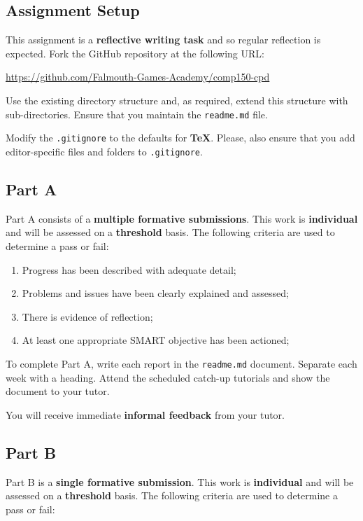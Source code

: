 \documentclass{../../fal_assignment}
\begin{document}
\subsection*{Assignment Setup}

This assignment is a \textbf{reflective writing task} and so regular reflection is expected. Fork the GitHub repository at the following URL:

\indent \url{https://github.com/Falmouth-Games-Academy/comp150-cpd}

Use the existing directory structure and, as required, extend this structure with sub-directories. Ensure that you maintain the \texttt{readme.md} file. 

Modify the \texttt{.gitignore} to the defaults for \textbf{TeX}. Please, also ensure that you add editor-specific files and folders to \texttt{.gitignore}. 

\subsection*{Part A}

Part A consists of a \textbf{multiple formative submissions}. This work is \textbf{individual} and will be assessed on a \textbf{threshold} basis. The following criteria are used to determine a pass or fail:

\begin{enumerate}[label=(\alph*)]
	\item Progress has been described with adequate detail;
	\item Problems and issues have been clearly explained and assessed;
	\item There is evidence of reflection;
	\item At least one appropriate SMART objective has been actioned;
\end{enumerate}

To complete Part A, write each report in the \texttt{readme.md} document. Separate each week with a heading. Attend the scheduled catch-up tutorials and show the document to your tutor. 

You will receive immediate \textbf{informal feedback} from your tutor.

\subsection*{Part B}

Part B is a \textbf{single formative submission}. This work is \textbf{individual} and will be assessed on a \textbf{threshold} basis. The following criteria are used to determine a pass or fail:
\end{document}
